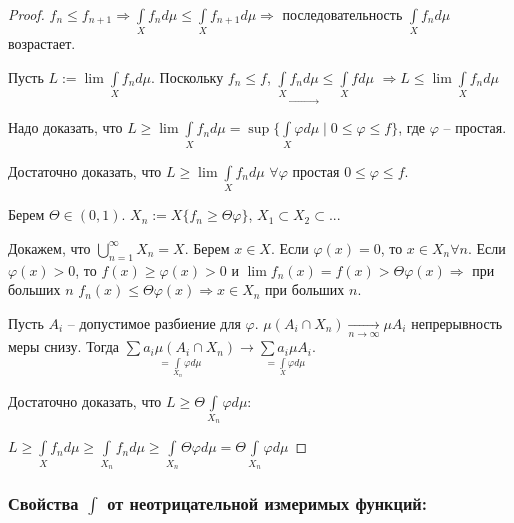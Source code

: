 \begin{proof}
    $f_n \leq f_{n+1}\Rightarrow \int\limits_X f_n d\mu \leq \int\limits_X f_{n+1} d\mu\Rightarrow$
    последовательность $\int\limits_X f_n d\mu$ возрастает.

    Пусть $L:=\lim \int\limits_X f_n d\mu$. Поскольку $f_n\leq f$, $\underset{\rightarrow}{\int\limits_X f_n d\mu} \leq \int\limits_X f d\mu$
    $\Rightarrow L\leq \lim  \int\limits_X f_n d\mu$

    Надо доказать, что $L\geq \lim\int\limits_X f_n d\mu=\sup\{\int\limits_X\varphi
    d\mu \mid 0\leq \varphi \leq f\}$, где $\varphi$ – простая. 

    Достаточно доказать, что $L\geq \lim\int\limits_X f_n d\mu$ $\forall \varphi$ простая 
    $0\leq \varphi \leq f$.

    Берем $\Theta\in (0, 1)$. $X_n:=X\{f_n\geq \Theta \varphi\}$, $X_1\subset X_2\subset ...$

    Докажем, что $\bigcup\limits_{n=1}^\infty X_n = X$. Берем $x\in X$. 
    Если $\varphi(x)=0$, то $x\in X_n\forall n$.
    Если $\varphi(x)>0$, то $f(x)\geq \varphi(x)>0$ и $\lim f_n(x)=f(x)>\Theta \varphi(x)
    \Rightarrow$ при больших $n$ $f_n(x)\leq \Theta \varphi(x)\Rightarrow x\in X_n$ при больших $n$.

    Пусть $A_i$ – допустимое разбиение для $\varphi$. $\mu (A_i\cap X_n)\underset{n\rightarrow \infty}{\rightarrow}
    \mu A_i$ непрерывность меры снизу. Тогда $\underset{=\int\limits_{X_n}\varphi d\mu}{\sum a_i \mu(A_i\cap X_n)} \rightarrow  
    \underset{=\int\limits_X\varphi d\mu}{\sum a_i \mu A_i}$.

    Достаточно доказать, что $L\geq \Theta \int\limits_{X_n}\varphi d\mu$: 

    $L\geq \int\limits_Xf_n d\mu\geq \int\limits_{X_n} f_n d\mu\geq \int\limits_{X_n} \Theta \varphi d\mu=
    \Theta \int\limits_{X_n} \varphi d\mu$
\end{proof}

\subsubsection*{Свойства $\int$ от неотрицательной измеримых функций:}

